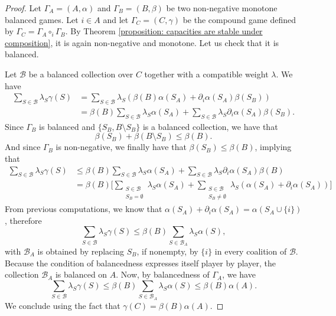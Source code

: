 \documentclass[a4paper,12pt]{amsart}
\newcommand{\calB}{\mathcal{B}}
\begin{document}
\begin{proof}
    Let \(\Gamma_A = (A, \alpha) \) and \(\Gamma_B = (B, \beta)\) be two non-negative monotone balanced games. Let \(i \in A\) and let \(\Gamma_C = (C, \gamma)\) be the compound game defined by \(\Gamma_C = \Gamma_A \circ_i \Gamma_B\). By Theorem \ref{proposition: capacities are stable under composition}, it is again non-negative and monotone. Let us check that it is balanced.

    \medskip
    
    Let \(\calB\) be a balanced collection over \(C\) together with a compatible weight \(\lambda\). We have 
    \[ \begin{aligned} 
    \sum_{S \in \calB} \lambda_S \gamma(S) & = \sum_{S \in \calB} \lambda_S \left( \beta(B) \alpha(S_A) + \partial_i \alpha(S_A) \beta(S_B) \right) \\
    & = \beta(B) \sum_{S \in \calB} \lambda_S \alpha(S_A) + \sum_{S \in \calB} \lambda_S \partial_i \alpha(S_A) \beta(S_B). 
    \end{aligned} \]
    Since \(\Gamma_B\) is balanced and \(\{S_B, B \setminus S_B\}\) is a balanced collection, we have that 
    \[
    \beta(S_B) + \beta(B \setminus S_B) \leq \beta(B). 
    \]
    And since \(\Gamma_B\) is non-negative, we finally have that \(\beta(S_B) \leq \beta(B)\), implying that
    \[ \begin{aligned} 
    \sum_{S \in \calB} \lambda_S \gamma(S) & \leq \beta(B) \sum_{S \in \calB} \lambda_S \alpha(S_A) + \sum_{S \in \calB} \lambda_S \partial_i \alpha(S_A) \beta(B) \\
    & = \beta(B) \Big[ \sum_{\substack{S \in \calB \\ S_B = \emptyset}} \lambda_S \alpha(S_A) + \sum_{\substack{S \in \calB \\ S_B \neq \emptyset}} \lambda_S \left( \alpha(S_A) + \partial_i \alpha(S_A) \right) \Big] 
    \end{aligned} \]
    From previous computations, we know that \(\alpha(S_A) + \partial_i \alpha(S_A) = \alpha(S_A \cup \{i\}) \), therefore
    \[
    \sum_{S \in \calB} \lambda_S \gamma(S) \leq \beta(B) \sum_{S \in \calB_A} \lambda_S \alpha(S), 
    \]
    with \(\calB_A\) is obtained by replacing \(S_B\), if nonempty, by \(\{i\}\) in every coalition of \(\calB\). Because the condition of balancedness expresses itself player by player, the collection \(\calB_A\) is balanced on \(A\). Now, by balancedness of \(\Gamma_A\), we have 
    \[
    \sum_{S \in \calB} \lambda_S \gamma(S) \leq \beta(B) \sum_{S \in \calB_A} \lambda_S \alpha(S) \leq \beta(B) \alpha(A). 
    \]
We conclude using the fact that \(\gamma(C) = \beta(B) \alpha(A)\).  
\end{proof}
\end{document}
